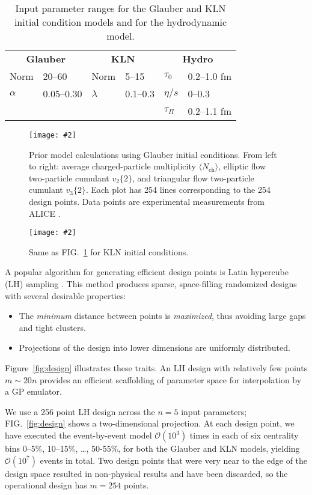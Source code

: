 \documentclass[aps,prc,reprint,amsmath]{revtex4-1}
\newcommand{\widefig}[3][t]{
  \begin{figure*}[#1]
    \texttt{[image: \#2]}
    \caption{\label{fig:#2}#3}
  \end{figure*}
}
\newcommand{\avg}[1]{\langle #1 \rangle}
\newcommand{\nch}{N_\text{ch}}
\newcommand{\vnk}[2]{v_#1\{#2\}}
\begin{document}
\begin{table}[t]
  \caption{
    \label{tab:design}
    Input parameter ranges for the Glauber and KLN initial condition models and for the hydrodynamic model.
  }
  \begin{ruledtabular}
  \begin{tabular}{llllll}
    \multicolumn{2}{c}{\bf Glauber} &
    \multicolumn{2}{c}{\bf KLN} &
    \multicolumn{2}{c}{\bf Hydro} \\
    Norm & 20--60 &
    Norm & 5--15 &
    $\tau_0$ & 0.2--1.0 fm \\
    $\alpha$ & 0.05--0.30&
    $\lambda$ & 0.1--0.3 &
    $\eta/s$ & 0--0.3 \\
    & & & & $\tau_\Pi$ & 0.2--1.1 fm \\
  \end{tabular}
  \end{ruledtabular}
\end{table}

\widefig{prior_draws_glb}{
  Prior model calculations using Glauber initial conditions.
  From left to right:
  average charged-particle multiplicity $\avg\nch$,
  elliptic flow two-particle cumulant $\vnk 2 2$,
  and triangular flow two-particle cumulant $\vnk 3 2$.
  Each plot has 254 lines corresponding to the 254 design points.
  Data points are experimental measurements from ALICE \cite{Abelev:2014mda}.
}

\widefig{prior_draws_kln}{
  Same as FIG.~\ref{fig:prior_draws_glb} for KLN initial conditions.
}

A popular algorithm for generating efficient design points is Latin hypercube (LH) sampling \cite{Tang:1993lh}.
This method produces sparse, space-filling randomized designs with several desirable properties:
\begin{itemize}
  \item The \emph{minimum} distance between points is \emph{maximized}, thus avoiding large gaps and tight clusters.
  \item Projections of the design into lower dimensions are uniformly distributed.
\end{itemize}
Figure~\ref{fig:design} illustrates these traits.
An LH design with relatively few points $m \sim 20n$ provides an efficient scaffolding of parameter space for interpolation by a GP emulator.

We use a 256 point LH design across the $n = 5$ input parameters; FIG.~\ref{fig:design} shows a two-dimensional projection.
At each design point, we have executed the event-by-event model $\mathcal O(10^3)$ times in each of six centrality bins 0--5\%, 10--15\%, \ldots, 50-55\%, for both the Glauber and KLN models, yielding $\mathcal O(10^7)$ events in total.
Two design points that were very near to the edge of the design space resulted in non-physical results and have been discarded, so the operational design has $m = 254$ points.
\end{document}
